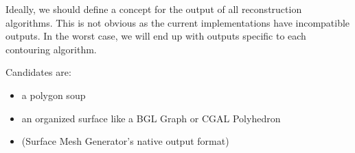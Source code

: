 Ideally, we should define a concept for the output of all reconstruction algorithms.
This is not obvious as the current implementations have incompatible
outputs. In the worst case, we will end up with outputs specific to
each contouring algorithm.

Candidates are:

\begin{itemize}
\item a polygon soup
\item an organized surface like a BGL Graph or CGAL Polyhedron
\item {} (Surface Mesh Generator's
native output format)
\end{itemize}

